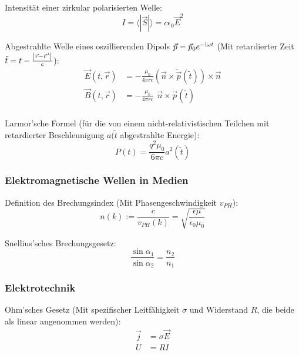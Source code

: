 \documentclass[11pt]{article}
\numberwithin{equation}{section}
\begin{document}
				\noindent
				Intensität einer zirkular polarisierten Welle:
				\begin{equation}
					I = \langle|\vec{S}|\rangle = c\epsilon_0\vec{E}^2
				\end{equation}

				\noindent
				Abgestrahlte Welle eines oszillierenden Dipols $\vec{p} = \vec{p}_0 e^{-\mathrm{i}\omega t}$ (Mit retardierter Zeit $\tilde{t} = t-\frac{\left|\vec{r}-\pvec{r}'\right|}{c}$):
				\begin{equation}
					\begin{aligned}
						\vec{E}(t,\vec{r}) &= -\frac{\mu_0}{4\pi r c}	\left(\vec{n}\times\ddot{\vec{p}}(\tilde{t})\right) \times \vec{n} \\
						\vec{B}(t,\vec{r}) &= -\frac{\mu_0}{4\pi r c} \phantom{\Big(}\vec{n}\times\ddot{\vec{p}}(\tilde{t}) \\
					\end{aligned}
				\end{equation}

				\noindent
				Larmor'sche Formel (für die von einem nicht-relativistischen Teilchen mit retardierter Beschleunigung $a(\tilde{t}$ abgestrahlte Energie):
				\begin{equation}
					P(t) = \frac{q^2 \mu_0}{6\pi c}a^2(\tilde{t})
				\end{equation}

			\subsubsection{Elektromagnetische Wellen in Medien}
				\noindent
				Definition des Brechungsindex (Mit Phasengeschwindigkeit $v_{PH}$):
				\begin{equation}
					n(k) := \frac{c}{v_{PH}(k)} = \sqrt{\frac{\epsilon\mu}{\epsilon_0\mu_0}}
				\end{equation}

				\noindent
				Snellius'sches Brechungsgesetz:
				\begin{equation}
					\frac{\sin\alpha_1}{\sin\alpha_2} = \frac{n_2}{n_1}
				\end{equation}



			\subsubsection{Elektrotechnik}
				\noindent
				Ohm'sches Gesetz (Mit spezifischer Leitfähigkeit $\sigma$ und Widerstand $R$, die beide als linear angenommen werden):
				\begin{equation}
					\begin{aligned}
						\vec{j} &= \sigma\vec{E} \\
						U &= R I
					\end{aligned}
				\end{equation}
\end{document}
